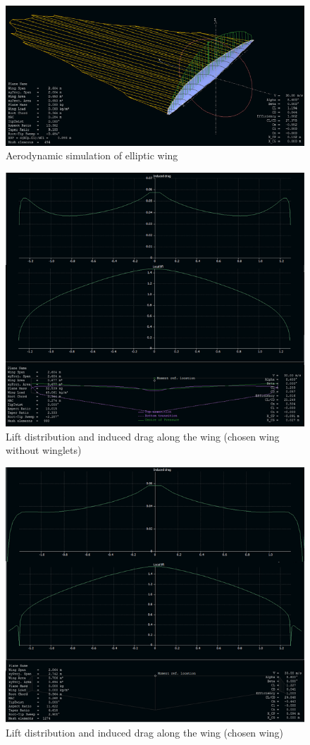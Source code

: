 \documentclass[english,fira]{ist-report}
\begin{document}
\begin{figure}[!ht]
	\centering
	\includegraphics[width = 0.65\linewidth]{graphics/Aero_simulation_wing_elliptic.png}
	\caption{Aerodynamic simulation of elliptic wing}
	\label{fig:simulation_elliptic_wing}
\end{figure}

\begin{figure}[!ht]
    \centering
    	\includegraphics[width = 0.55\linewidth]{graphics/aero_simulation_withoutwinglets(induced).png}
    \caption{Lift distribution and induced drag along the wing (chosen wing without winglets)}
    \label{fig:simulation_withoutwinglets_induced}
\end{figure}
\begin{figure}[!ht]
    \centering
    	\includegraphics[width = 0.55\linewidth]{graphics/aero_simulation_chosen(induced).png}
    \caption{Lift distribution and induced drag along the wing (chosen wing)}
    \label{fig:simulation_chosen_wing_induced}
\end{figure}
\end{document}
